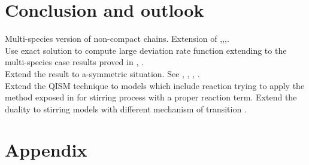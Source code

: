 \documentclass[10pt]{article}
\numberwithin{equation}{section}
\numberwithin{equation}{subsection}
\newcommand{\oa}{\mathbf{a}}
\newcommand{\oad}{\mathbf{a}^{+}}
\begin{document}
\section{Conclusion and outlook}
Multi-species version of non-compact chains. Extension of \cite{frassek2022exact},\cite{frassek2022integrable},\cite{frassek2020non},\cite{frassek2021duality}. \\
Use exact solution to compute large deviation rate function extending to the multi-species case results proved in \cite{derrida1998exact}, \cite{mallick2022exact}. \\
Extend the result to a-symmetric situation. See \cite{belitsky2018self}, \cite{belitsky2015quantum}, \cite{crampe2016integrable}, \cite{finn2018matrix}. \\
Extend the QISM technique to models which include reaction trying to apply the method exposed in \cite{de2021yang} for stirring process with a proper reaction term. Extend the duality to stirring models with different mechanism of transition \cite{chatterjee2023multi}. 







\appendix
\section*{Appendix}
\begin{comment}
{\color{blue}
\section{Oscillator realization}\label{appA}

 The basis element $ (E_{ab})_{a,b\in\{1,\ldots,N\}}$ of $gl(N)$ can also be thought as proper compositions of the rising, and lowering operators of th Heisenberg Lie algebra
  \begin{equation}\label{creationOperators}
	\begin{cases}
	\oad_{a}|n_{1},\ldots,n_{a},\ldots,n_{N}\rangle = |n_{1},\ldots,n_{a}+1,\ldots,n_{N}\rangle\\
	\oa_{a}|n_{1},\ldots,n_{a},\ldots,n_{N}\rangle =n_{a}|n_{1},\ldots,n_{a}-1,\ldots,n_{N}\rangle
	\end{cases}
\end{equation}
with commutaion relations
\begin{equation}
	[\oad_{a},\oa_{b}]=-\mathbbm{1}\,\delta_{ab}
\end{equation}
Therefore, we have that 
\begin{equation}
		E_{ab}=\oad_{a}\oa_{b}\qquad \forall a,b=1,\ldots N
\end{equation} 
fulfil the action on the basis vector \eqref{actionE} and the commutation relation \eqref{eq:comgl} }
\end{comment}
\end{document}
